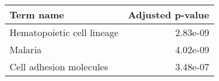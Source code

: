 \begin{tabular}{lr}
\toprule
                 Term name &  Adjusted p-value \\
\midrule
Hematopoietic cell lineage &          2.83e-09 \\
                   Malaria &          4.02e-09 \\
   Cell adhesion molecules &          3.48e-07 \\
\bottomrule
\end{tabular}
